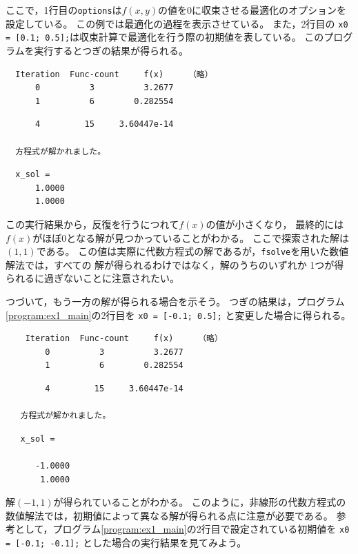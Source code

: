 \documentclass[tombow,dvipdfmx]{corona-a5-1.1}
\begin{document}
{\begin{例}[代数方程式の解の探索]
ここで，1行目の\verb|options|は$f(x,y)$の値を0に収束させる最適化のオプションを設定している。
この例では最適化の過程を表示させている。
また，2行目の
\verb|x0 = [0.1; 0.5];|は収束計算で最適化を行う際の初期値を表している。
このプログラムを実行するとつぎの結果が得られる。

\smallskip
\begin{実行結果}
\begin{verbatim}
  Iteration  Func-count     f(x)     （略）
      0          3          3.2677
      1          6        0.282554
\end{verbatim}
\omitcode
\begin{verbatim}
      4         15     3.60447e-14

  方程式が解かれました。
\end{verbatim}
\omitcode
\begin{verbatim}
  x_sol =
      1.0000
      1.0000
\end{verbatim}
\end{実行結果}

この実行結果から，反復を行うにつれて$f(x)$の値が小さくなり，
最終的には$f(x)$がほぼ0となる解が見つかっていることがわかる。
ここで探索された解は$(1, 1)$である。
この値は実際に代数方程式の解であるが，\verb|fsolve|を用いた数値解法では，すべての
解が得られるわけではなく，解のうちのいずれか
1つが得られるに過ぎないことに注意されたい。

つづいて，もう一方の解が得られる場合を示そう。
つぎの結果は，プログラム\nobreak\ref{program:ex1_main}の2行目を
\verb|x0 = [-0.1; 0.5];|
と変更した場合に得られる。

\smallskip
\begin{実行結果}
\begin{verbatim}
    Iteration  Func-count     f(x)     （略）
        0          3          3.2677
        1          6        0.282554
\end{verbatim}
\omitcode
\begin{verbatim}
        4         15     3.60447e-14
   
   方程式が解かれました。
\end{verbatim}
\omitcode
\begin{verbatim}
   x_sol =
   
      -1.0000
       1.0000
\end{verbatim}
\end{実行結果}

解$(-1, 1)$が得られていることがわかる。
このように，非線形の代数方程式の数値解法では，初期値によって異なる解が得られる点に注意が必要である。
参考として，プログラム\nobreak\ref{program:ex1_main}の2行目で設定されている初期値を
\verb|x0 = [-0.1; -0.1];|
とした場合の実行結果を見てみよう。


\end{例}}
\end{document}
